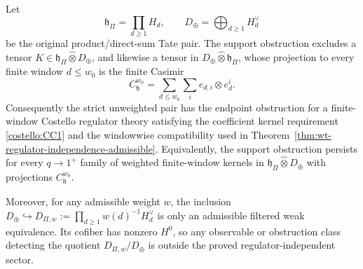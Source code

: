 \begin{thm}
\label{thm:strict-unweighted-obstruction}
  Let
	  \[
	    \mathfrak h_{\Pi}=\prod_{d\geq1}H_d,\qquad
	    D_{\oplus}=\bigoplus_{d\geq1}H_d^\vee
	  \]
	  be the original product/direct-sum Tate pair.  The support
	  obstruction excludes a tensor
	  \(K\in\mathfrak h_{\Pi}\widehat\otimes D_{\oplus}\), and likewise a
	  tensor in \(D_{\oplus}\widehat\otimes\mathfrak h_{\Pi}\), whose
	  projection to every finite window \(d\leq w_0\) is the finite Casimir
  \[
    C^{w_0}_{\mathfrak h}=\sum_{d\leq w_0}\sum_i e_{d,i}\otimes e^i_d .
  \]
	  Consequently the strict unweighted pair has the endpoint obstruction
	  for a finite-window Costello regulator theory satisfying the
	  coefficient kernel requirement \ref{costello:CC1} and the windowwise
	  compatibility used in
	  Theorem~\ref{thm:wt-regulator-independence-admissible}. Equivalently,
	  the support obstruction persists for every \(q\to1^+\) family of
	  weighted finite-window kernels in
	  \(\mathfrak h_{\Pi}\widehat\otimes D_{\oplus}\) with projections
	  \(C^{w_0}_{\mathfrak h}\).

  Moreover, for any admissible weight \(w\), the inclusion
  \(D_{\oplus}\hookrightarrow
  D_{\Pi,w}:=\prod_{d\geq1}w(d)^{-1}H_d^\vee\) is only an admissible
  filtered weak equivalence.  Its cofiber has nonzero \(H^0\), so any observable or
  obstruction class detecting the quotient
  \(D_{\Pi,w}/D_{\oplus}\) is outside the proved regulator-independent
  sector.
\end{thm}

